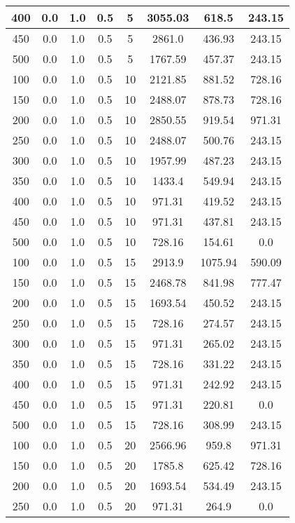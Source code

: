 \documentclass[a4paper, 12pt]{extreport}
\begin{document}
\begin{itemize}
\begin{longtable}{|c|c|c|c|c|c|c|c|}
			400 & 0.0 & 1.0 & 0.5 & 5 & 3055.03 & 618.5 & 243.15 \\\hline
			450 & 0.0 & 1.0 & 0.5 & 5 & 2861.0 & 436.93 & 243.15 \\\hline
			500 & 0.0 & 1.0 & 0.5 & 5 & 1767.59 & 457.37 & 243.15 \\\hline
			100 & 0.0 & 1.0 & 0.5 & 10 & 2121.85 & 881.52 & 728.16 \\\hline
			150 & 0.0 & 1.0 & 0.5 & 10 & 2488.07 & 878.73 & 728.16 \\\hline
			200 & 0.0 & 1.0 & 0.5 & 10 & 2850.55 & 919.54 & 971.31 \\\hline
			250 & 0.0 & 1.0 & 0.5 & 10 & 2488.07 & 500.76 & 243.15 \\\hline
			300 & 0.0 & 1.0 & 0.5 & 10 & 1957.99 & 487.23 & 243.15 \\\hline
			350 & 0.0 & 1.0 & 0.5 & 10 & 1433.4 & 549.94 & 243.15 \\\hline
			400 & 0.0 & 1.0 & 0.5 & 10 & 971.31 & 419.52 & 243.15 \\\hline
			450 & 0.0 & 1.0 & 0.5 & 10 & 971.31 & 437.81 & 243.15 \\\hline
			500 & 0.0 & 1.0 & 0.5 & 10 & 728.16 & 154.61 & 0.0 \\\hline
			100 & 0.0 & 1.0 & 0.5 & 15 & 2913.9 & 1075.94 & 590.09 \\\hline
			150 & 0.0 & 1.0 & 0.5 & 15 & 2468.78 & 841.98 & 777.47 \\\hline
			200 & 0.0 & 1.0 & 0.5 & 15 & 1693.54 & 450.52 & 243.15 \\\hline
			250 & 0.0 & 1.0 & 0.5 & 15 & 728.16 & 274.57 & 243.15 \\\hline
			300 & 0.0 & 1.0 & 0.5 & 15 & 971.31 & 265.02 & 243.15 \\\hline
			350 & 0.0 & 1.0 & 0.5 & 15 & 728.16 & 331.22 & 243.15 \\\hline
			400 & 0.0 & 1.0 & 0.5 & 15 & 971.31 & 242.92 & 243.15 \\\hline
			450 & 0.0 & 1.0 & 0.5 & 15 & 971.31 & 220.81 & 0.0 \\\hline
			500 & 0.0 & 1.0 & 0.5 & 15 & 728.16 & 308.99 & 243.15 \\\hline
			100 & 0.0 & 1.0 & 0.5 & 20 & 2566.96 & 959.8 & 971.31 \\\hline
			150 & 0.0 & 1.0 & 0.5 & 20 & 1785.8 & 625.42 & 728.16 \\\hline
			200 & 0.0 & 1.0 & 0.5 & 20 & 1693.54 & 534.49 & 243.15 \\\hline
			250 & 0.0 & 1.0 & 0.5 & 20 & 971.31 & 264.9 & 0.0 \\\hline

\end{longtable}
\end{itemize}
\end{document}
